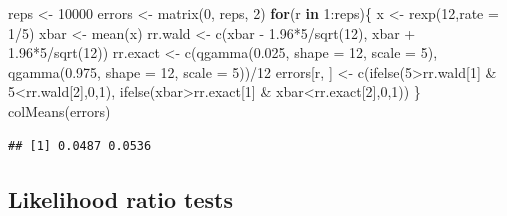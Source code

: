 \documentclass[
]{book}
\newenvironment{Shaded}{\begin{snugshade}}{\end{snugshade}}
\newcommand{\AttributeTok}[1]{\textcolor[rgb]{0.77,0.63,0.00}{#1}}
\newcommand{\ControlFlowTok}[1]{\textcolor[rgb]{0.13,0.29,0.53}{\textbf{#1}}}
\newcommand{\DecValTok}[1]{\textcolor[rgb]{0.00,0.00,0.81}{#1}}
\newcommand{\FloatTok}[1]{\textcolor[rgb]{0.00,0.00,0.81}{#1}}
\newcommand{\FunctionTok}[1]{\textcolor[rgb]{0.00,0.00,0.00}{#1}}
\newcommand{\NormalTok}[1]{#1}
\newcommand{\OtherTok}[1]{\textcolor[rgb]{0.56,0.35,0.01}{#1}}
\newcommand{\SpecialCharTok}[1]{\textcolor[rgb]{0.00,0.00,0.00}{#1}}
\begin{document}
\begin{Shaded}
\begin{Highlighting}[]
\NormalTok{reps }\OtherTok{\textless{}{-}} \DecValTok{10000}
\NormalTok{errors }\OtherTok{\textless{}{-}} \FunctionTok{matrix}\NormalTok{(}\DecValTok{0}\NormalTok{, reps, }\DecValTok{2}\NormalTok{)}
\ControlFlowTok{for}\NormalTok{(r }\ControlFlowTok{in} \DecValTok{1}\SpecialCharTok{:}\NormalTok{reps)\{}
\NormalTok{  x }\OtherTok{\textless{}{-}} \FunctionTok{rexp}\NormalTok{(}\DecValTok{12}\NormalTok{,}\AttributeTok{rate =} \DecValTok{1}\SpecialCharTok{/}\DecValTok{5}\NormalTok{)}
\NormalTok{  xbar }\OtherTok{\textless{}{-}} \FunctionTok{mean}\NormalTok{(x)}
\NormalTok{  rr.wald }\OtherTok{\textless{}{-}} \FunctionTok{c}\NormalTok{(xbar }\SpecialCharTok{{-}} \FloatTok{1.96}\SpecialCharTok{*}\DecValTok{5}\SpecialCharTok{/}\FunctionTok{sqrt}\NormalTok{(}\DecValTok{12}\NormalTok{), xbar }\SpecialCharTok{+} \FloatTok{1.96}\SpecialCharTok{*}\DecValTok{5}\SpecialCharTok{/}\FunctionTok{sqrt}\NormalTok{(}\DecValTok{12}\NormalTok{))}
\NormalTok{  rr.exact }\OtherTok{\textless{}{-}} \FunctionTok{c}\NormalTok{(}\FunctionTok{qgamma}\NormalTok{(}\FloatTok{0.025}\NormalTok{, }\AttributeTok{shape =} \DecValTok{12}\NormalTok{, }\AttributeTok{scale =} \DecValTok{5}\NormalTok{), }\FunctionTok{qgamma}\NormalTok{(}\FloatTok{0.975}\NormalTok{, }\AttributeTok{shape =} \DecValTok{12}\NormalTok{, }\AttributeTok{scale =} \DecValTok{5}\NormalTok{))}\SpecialCharTok{/}\DecValTok{12}
\NormalTok{  errors[r, ] }\OtherTok{\textless{}{-}} \FunctionTok{c}\NormalTok{(}\FunctionTok{ifelse}\NormalTok{(}\DecValTok{5}\SpecialCharTok{\textgreater{}}\NormalTok{rr.wald[}\DecValTok{1}\NormalTok{] }\SpecialCharTok{\&} \DecValTok{5}\SpecialCharTok{\textless{}}\NormalTok{rr.wald[}\DecValTok{2}\NormalTok{],}\DecValTok{0}\NormalTok{,}\DecValTok{1}\NormalTok{), }\FunctionTok{ifelse}\NormalTok{(xbar}\SpecialCharTok{\textgreater{}}\NormalTok{rr.exact[}\DecValTok{1}\NormalTok{] }\SpecialCharTok{\&}\NormalTok{ xbar}\SpecialCharTok{\textless{}}\NormalTok{rr.exact[}\DecValTok{2}\NormalTok{],}\DecValTok{0}\NormalTok{,}\DecValTok{1}\NormalTok{))}
\NormalTok{\}}
\FunctionTok{colMeans}\NormalTok{(errors)}
\end{Highlighting}
\end{Shaded}

\begin{verbatim}
## [1] 0.0487 0.0536
\end{verbatim}

\hypertarget{likelihood-ratio-tests}{%
\subsection{Likelihood ratio tests}\label{likelihood-ratio-tests}}
\end{document}
